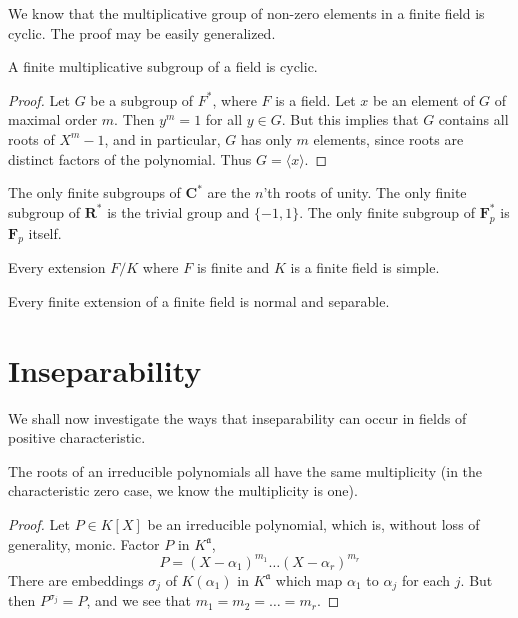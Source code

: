 We know that the multiplicative group of non-zero elements in a finite field is cyclic. The proof may be easily generalized.

\begin{theorem}
    A finite multiplicative subgroup of a field is cyclic.
\end{theorem}
\begin{proof}
    Let $G$ be a subgroup of $F^*$, where $F$ is a field. Let $x$ be an element of $G$ of maximal order $m$. Then $y^m = 1$ for all $y \in G$. But this implies that $G$ contains all roots of $X^m - 1$, and in particular, $G$ has only $m$ elements, since roots are distinct factors of the polynomial. Thus $G = \langle x \rangle$.
\end{proof}

\begin{example}
    The only finite subgroups of $\mathbf{C}^*$ are the $n$'th roots of unity. The only finite subgroup of $\mathbf{R}^*$ is the trivial group and $\{ -1, 1 \}$. The only finite subgroup of $\mathbf{F}^*_p$ is $\mathbf{F}_p$ itself.
\end{example}

\begin{corollary}
    Every extension $F/K$ where $F$ is finite and $K$ is a finite field is simple.
\end{corollary}

\begin{corollary}
    Every finite extension of a finite field is normal and separable.
\end{corollary}





\section{Inseparability}

We shall now investigate the ways that inseparability can occur in fields of positive characteristic.

\begin{theorem}
    The roots of an irreducible polynomials all have the same multiplicity (in the characteristic zero case, we know the multiplicity is one).
\end{theorem}
\begin{proof}
    Let $P \in K[X]$ be an irreducible polynomial, which is, without loss of generality, monic. Factor $P$ in $K^{\mathfrak{a}}$,
    \[ P = (X - \alpha_1)^{m_1} \dots (X - \alpha_r)^{m_r} \]
    There are embeddings $\sigma_j$ of $K(\alpha_1)$ in $K^{\mathfrak{a}}$ which map $\alpha_1$ to $\alpha_j$ for each $j$. But then $P^{\sigma_j} = P$, and we see that $m_1 = m_2 = \dots = m_r$.
\end{proof}

